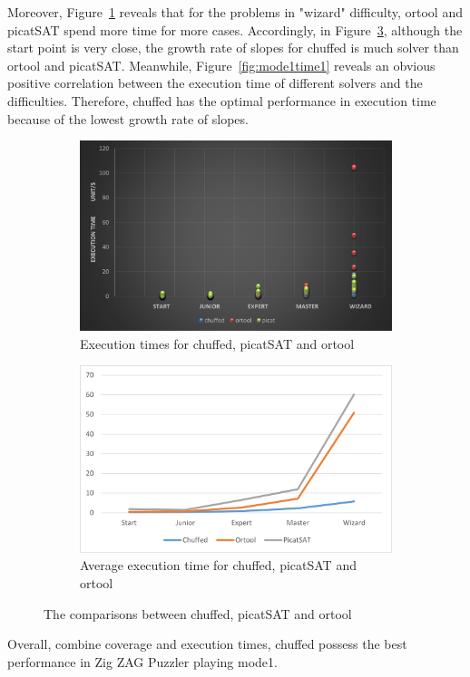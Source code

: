 Moreover, Figure~\ref{fig:time1three} reveals that for the problems in "wizard" difficulty, ortool and picatSAT spend more time for more cases. Accordingly, in Figure~\ref{fig:time1threeslope}, although the start point is very close, the growth rate of slopes for chuffed is much solver than ortool and picatSAT. Meanwhile, Figure~\ref{fig:mode1time1} reveals an obvious positive correlation between the execution time of different solvers and the difficulties. Therefore, chuffed has the optimal performance in execution time because of the lowest growth rate of slopes. 
\begin{figure}[htbp]
    \centering
    \begin{subfigure}[b]{0.48\textwidth}
     \includegraphics[width=\textwidth]{figs/time1three.png}
    \caption{Execution times for chuffed, picatSAT and ortool}
    \label{fig:time1three}
    \end{subfigure}
    \begin{subfigure}[b]{0.48\textwidth}
     \includegraphics[width=\textwidth]{figs/mode1solverscomparison.png}
    \caption{Average execution time for chuffed, picatSAT and ortool}
    \label{fig:time1threeslope}
    \end{subfigure}
    \caption{The comparisons between chuffed, picatSAT and ortool}
\end{figure}
Overall, combine coverage and execution times, chuffed possess the best performance in Zig ZAG Puzzler playing mode1.
